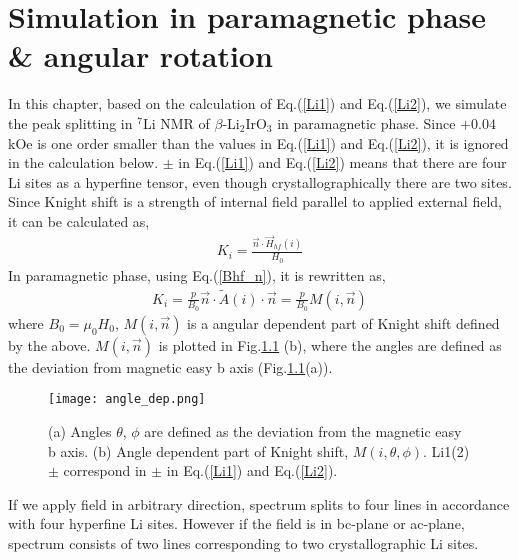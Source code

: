 \appendix
\chapter{Simulation in paramagnetic phase \& angular rotation}
\label{appendix_simu}
In this chapter, based on the calculation of Eq.(\ref{Li1}) and Eq.(\ref{Li2}), we simulate the peak splitting in ${}^7$Li NMR of $\beta$-Li$_2$IrO$_3$ in paramagnetic phase.
Since $+ 0 .04$ kOe is one order smaller than the values in Eq.(\ref{Li1}) and Eq.(\ref{Li2}), it is ignored in the calculation below.
$\pm$ in Eq.(\ref{Li1}) and Eq.(\ref{Li2}) means that there are four Li sites as a hyperfine tensor, even though crystallographically there are two sites.
Since Knight shift is a strength of internal field parallel to applied external field, it can be calculated as,
\begin{align}
K_i = \frac{\vec{n}\cdot\overrightarrow{H}_{hf}(i)}{H_0}
\end{align}
In paramagnetic phase, using Eq.(\ref{Bhf_n}), it is rewritten as,
\begin{align}
K_i = \frac{p}{B_0}\vec{n}\cdot\tilde{A}(i)\cdot\vec{n} = \frac{p}{B_0}M(i, \vec{n})
\end{align}
where $B_0 = \mu_0H_0$, $M (i,\vec{n})$ is a angular dependent part of Knight shift defined by the above.
$M (i,\vec{n})$ is plotted in Fig.\ref{angle_dep} (b),
where the angles are defined as the deviation from magnetic easy b axis (Fig.\ref{angle_dep}(a)).
\begin{figure}
  \centering
  \texttt{[image: angle\_dep.png]}
  \caption{(a) Angles $\theta$, $\phi$ are defined as the deviation from the magnetic easy b axis.
  (b) Angle dependent part of Knight shift, $M (i, \theta, \phi)$.
  Li1(2)$\pm$ correspond in $\pm$ in Eq.(\ref{Li1}) and Eq.(\ref{Li2}).}
  \label{angle_dep}
\end{figure}
If we apply field in arbitrary direction, spectrum splits to four lines in accordance with four hyperfine Li sites.
However if the field is in bc-plane or ac-plane, spectrum consists of two lines corresponding to two crystallographic Li sites.


